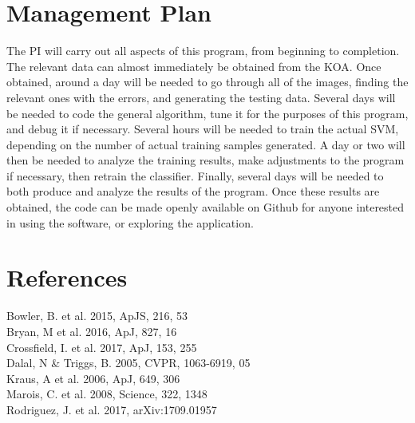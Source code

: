 \documentclass[12pt]{article}
\begin{document}
\section*{Management Plan}
The PI will carry out all aspects of this program, from beginning to completion. The relevant data can almost immediately be obtained from the KOA. Once obtained, around a day will be needed to go through all of the images, finding the relevant ones with the errors, and generating the testing data. Several days will be needed to code the general algorithm, tune it for the purposes of this program, and debug it if necessary. Several hours will be needed to train the actual SVM, depending on the number of actual training samples generated. A day or two will then be needed to analyze the training results, make adjustments to the program if necessary, then retrain the classifier. Finally, several days will be needed to both produce and analyze the results of the program. Once these results are obtained, the code can be made openly available on Github for anyone interested in using the software, or exploring the application.


\newpage
\section*{References}
Bowler, B. et al. 2015, ApJS, 216, 53\\
Bryan, M et al. 2016, ApJ, 827, 16\\
Crossfield, I. et al. 2017, ApJ, 153, 255\\
Dalal, N \& Triggs, B. 2005, CVPR, 1063-6919, 05\\
Kraus, A et al. 2006, ApJ, 649, 306\\
Marois, C. et al. 2008, Science, 322, 1348\\
Rodriguez, J. et al. 2017, arXiv:1709.01957
\end{document}
